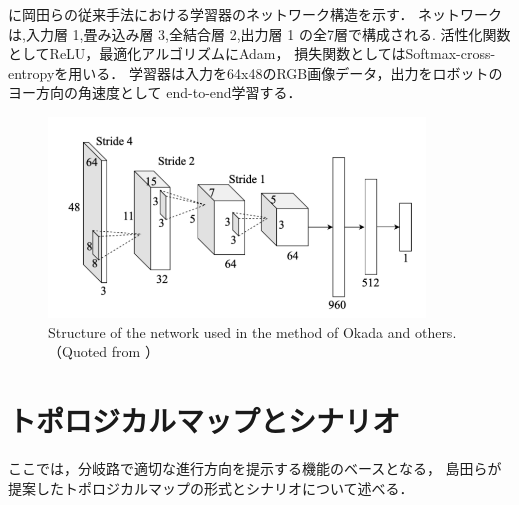 に岡田らの従来手法における学習器のネットワーク構造を示す．
ネットワークは,入力層 1,畳み込み層 3,全結合層 2,出力層 1 の全7層で構成される.
活性化関数としてReLU\cite{relu}，最適化アルゴリズムにAdam\cite{adam}，
損失関数としてはSoftmax-cross-entropyを用いる．
学習器は入力を64x48のRGB画像データ，出力をロボットのヨー方向の角速度として
end-to-end学習する．
\begin{figure}[htbp]
    \centering
     \includegraphics[width=100mm]{images/pdf/okada_network.pdf}
     \caption{Structure of the network used in the method of Okada and others. （Quoted from \cite{okada2020}）}
     \label{fig:okada_net}
\end{figure}

\clearpage
\section{トポロジカルマップとシナリオ}
\label{sec:shimada_topo}
ここでは，分岐路で適切な進行方向を提示する機能のベースとなる，
島田ら\cite{shimada2020}が提案したトポロジカルマップの形式とシナリオについて述べる．
